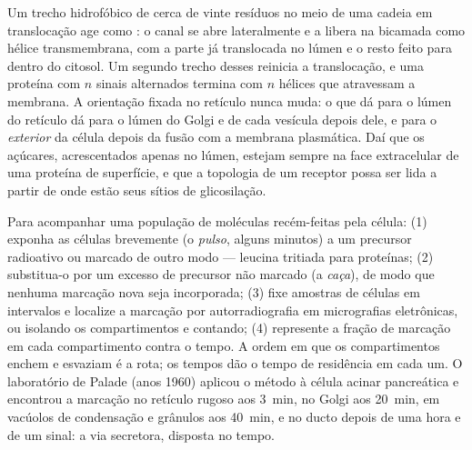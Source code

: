 \begin{proposition}\label{prop:b3:membrane-traffic:topology}
Um trecho hidrofóbico de cerca de vinte resíduos no meio de uma cadeia
em translocação age como \emph{}: o
canal se abre lateralmente e a libera na bicamada como hélice
transmembrana, com a parte já translocada no lúmen e o resto feito para
dentro do citosol. Um segundo trecho desses reinicia a translocação, e
uma proteína com $n$ sinais alternados termina com $n$ hélices que
atravessam a membrana. A orientação fixada no retículo nunca muda: o
que dá para o lúmen do retículo dá para o lúmen do Golgi e de cada
vesícula depois dele, e para o \emph{exterior} da célula depois da
fusão com a membrana plasmática. Daí que os açúcares, acrescentados
apenas no lúmen, estejam sempre na face extracelular de uma proteína de
superfície, e que a topologia de um receptor possa ser lida a partir de
onde estão seus sítios de glicosilação.
\end{proposition}

\begin{method}\label{met:b3:membrane-traffic:pulse-chase}
Para acompanhar uma população de moléculas recém-feitas pela célula:
(1) exponha as células brevemente (o \emph{pulso}, alguns minutos) a um
precursor radioativo ou marcado de outro modo --- leucina tritiada para
proteínas; (2) substitua-o por um excesso de precursor não marcado (a
\emph{caça}), de modo que nenhuma marcação nova seja incorporada; (3)
fixe amostras de células em intervalos e localize a marcação por
autorradiografia em micrografias eletrônicas, ou isolando os
compartimentos e contando; (4) represente a fração de marcação em cada
compartimento contra o tempo. A ordem em que os compartimentos enchem e
esvaziam é a rota; os tempos dão o tempo de residência em cada um. O
laboratório de Palade (anos 1960) aplicou o método à célula acinar
pancreática e encontrou a marcação no retículo rugoso aos \qty{3}{min},
no Golgi aos \qty{20}{min}, em vacúolos de condensação e grânulos aos
\qty{40}{min}, e no ducto depois de uma hora e de um sinal: a via
secretora, disposta no tempo.
\end{method}

